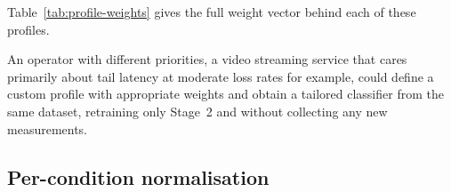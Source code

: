 Table~\ref{tab:profile-weights} gives the full weight vector behind each of
these profiles.

\begin{table}[htbp]
  \centering
  \caption{Composite-score weight vectors for the five deployment profiles.
           Each column sums to 1.00. \emph{Dir.} is the optimisation direction:
           $+$ means higher is better (goodput is the only such metric), $-$
           means lower is better. A dash means the metric is unused in that
           profile.}
  \label{tab:profile-weights}
\end{table}

An operator with different priorities, a video streaming service that
cares primarily about tail latency at moderate loss rates for example,
could define a custom profile with appropriate weights and obtain a tailored
classifier from the same dataset, retraining only Stage~2 and without collecting
any new measurements.

\subsection{Per-condition normalisation}
\label{subsec:normalisation}

